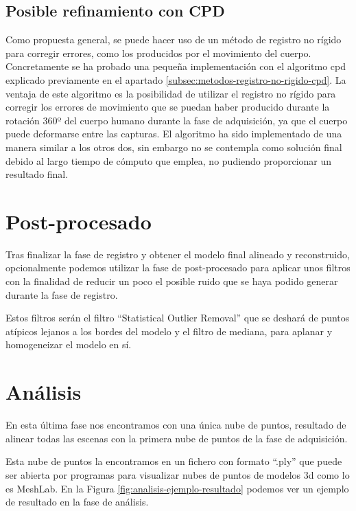 \subsection{Posible refinamiento con CPD}

Como propuesta general, se puede hacer uso de un método de registro no rígido para corregir errores, como los producidos por el movimiento del cuerpo.
Concretamente se ha probado una pequeña implementación con el algoritmo \gls{cpd} explicado previamente en el apartado \ref{subsec:metodos-registro-no-rigido-cpd}.
La ventaja de este algoritmo es la posibilidad de utilizar el registro no rígido para corregir los errores de movimiento que se puedan haber producido durante la rotación 360º del cuerpo humano durante la fase de adquisición, ya que el cuerpo puede deformarse entre las capturas.
El algoritmo ha sido implementado de una manera similar a los otros dos, sin embargo no se contempla como solución final debido al largo tiempo de cómputo que emplea, no pudiendo proporcionar un resultado final.

\section{Post-procesado}

Tras finalizar la fase de registro y obtener el modelo final alineado y reconstruido, opcionalmente podemos utilizar la fase de post-procesado para aplicar unos filtros con la finalidad de reducir un poco el posible ruido que se haya podido generar durante la fase de registro.

Estos filtros serán el filtro ``Statistical Outlier Removal'' que se deshará de puntos atípicos lejanos a los bordes del modelo y el filtro de mediana, para aplanar y homogeneizar el modelo en sí.

\section{Análisis}

En esta última fase nos encontramos con una única nube de puntos, resultado de alinear todas las escenas con la primera nube de puntos de la fase de adquisición.

Esta nube de puntos la encontramos en un fichero con formato ``.ply'' que puede ser abierta por programas para visualizar nubes de puntos de modelos \gls{3d} como lo es MeshLab.
En la Figura \ref{fig:analisis-ejemplo-resultado} podemos ver un ejemplo de resultado en la fase de análisis.


